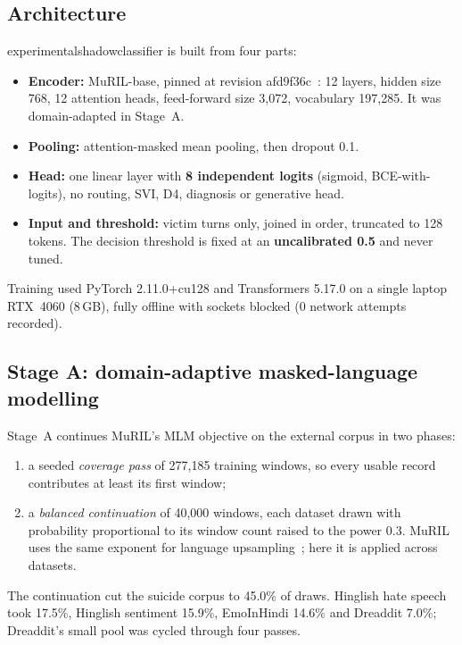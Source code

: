 \documentclass[11pt,a4paper]{article}
\newcommand{\codeus}{\textunderscore\allowbreak}
\DeclareRobustCommand{\code}[1]{{\ttfamily\let\_\codeus #1}}
\begin{document}
\subsection{Architecture}
\code{experimental\_shadow\_classifier} is built from four parts:
\begin{itemize}
  \item \textbf{Encoder:} MuRIL-base, pinned at revision \code{afd9f36c}~\cite{khanuja2021}: 12
        layers, hidden size 768, 12 attention heads, feed-forward size 3{,}072, vocabulary 197{,}285.
        It was domain-adapted in Stage~A.
  \item \textbf{Pooling:} attention-masked mean pooling, then dropout 0.1.
  \item \textbf{Head:} one linear layer with \textbf{8 independent logits} (sigmoid,
        BCE-with-logits), no routing, SVI, D4, diagnosis or generative head.
  \item \textbf{Input and threshold:} victim turns only, joined in order, truncated to 128 tokens.
        The decision threshold is fixed at an \textbf{uncalibrated 0.5} and never tuned.
\end{itemize}
Training used PyTorch 2.11.0+cu128 and Transformers 5.17.0 on a single laptop RTX~4060 (8\,GB),
fully offline with sockets blocked (0 network attempts recorded).

\subsection{Stage A: domain-adaptive masked-language modelling}
\label{sec:stageA}
Stage~A continues MuRIL's MLM objective on the external corpus in two phases:
\begin{enumerate}
  \item a seeded \emph{coverage pass} of 277{,}185 training windows, so every usable record
        contributes at least its first window;
  \item a \emph{balanced continuation} of 40{,}000 windows, each dataset drawn with probability
        proportional to its window count raised to the power 0.3. MuRIL uses the same exponent for
        language upsampling~\cite{khanuja2021}; here it is applied across datasets.
\end{enumerate}
The continuation cut the suicide corpus to 45.0\% of draws. Hinglish hate speech took 17.5\%,
Hinglish sentiment 15.9\%, EmoInHindi 14.6\% and Dreaddit 7.0\%; Dreaddit's small pool was cycled
through four passes.
\end{document}

